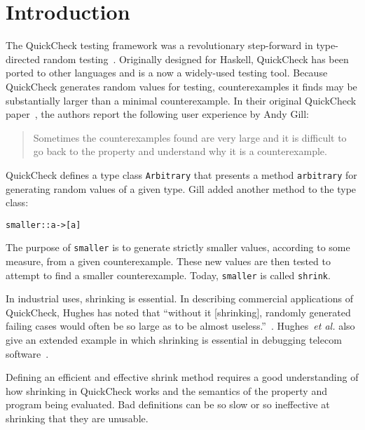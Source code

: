 \documentclass{sigplanconf}
\newenvironment{code}{\begin{alltt}}{\end{alltt}}
\newcommand{\ttp}[1]{\texttt{#1}}
\begin{document}
\section{Introduction}\label{sec:intro}
The QuickCheck testing framework was a revolutionary step-forward in
type-directed random testing~\cite{qc,monadic}.  Originally designed for Haskell,
QuickCheck has been ported to other languages and is a now a widely-used testing
tool.  Because QuickCheck generates random values for testing, counterexamples
it finds may be substantially larger than a minimal counterexample.  In their
original QuickCheck paper~\cite{qc}, the authors report the following user
experience by Andy Gill:
%
\begin{quote}
Sometimes the counterexamples found are very large and it is difficult to go
back to the property and understand why it is a counterexample.
\end{quote}
%
\noindent
QuickCheck defines a type class \ttp{Arbitrary} that presents a method
\ttp{arbitrary} for generating random values of a given type.  Gill added another
method to the type class:
%
\begin{code}
smaller :: a -> [a]
\end{code}
%
\noindent
The purpose of \ttp{smaller} is to generate strictly smaller values, according
to some measure, from a given counterexample.  These new values are then tested
to attempt to find a smaller counterexample.  Today, \ttp{smaller} is called
\ttp{shrink}.

In industrial uses, shrinking is essential.  In describing commercial
applications of QuickCheck, Hughes has noted that ``without it [shrinking],
randomly generated failing cases would often be so large as to be almost
useless.''~\cite{qcjh}.  Hughes~\emph{et al.} also give an extended example in
which shrinking is essential in debugging telecom software~\cite{telecom}.

Defining an efficient and effective shrink method requires a good understanding
of how shrinking in QuickCheck works and the semantics of the property and
program being evaluated.  Bad definitions can be so slow or so ineffective at
shrinking that they are unusable.
\end{document}
